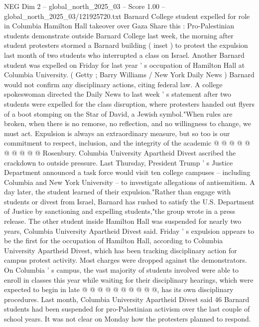 \begin{textsample}{NEG Dim 2 – global\_north\_2025\_03 – Score 1.00 – global\_north\_2025\_03/121925720.txt}  \label{ex:f2_neg_048}
Barnard College student expelled for role in Columbia Hamilton Hall takeover over Gaza Share this : Pro-Palestinian students demonstrate outside Barnard College last week, the morning after student protesters stormed a Barnard building ( inset ) to protest the expulsion last month of two students who interrupted a class on Israel.
Another Barnard student was expelled on Friday for last year ' s occupation of Hamilton Hall at Columbia University. ( Getty ; Barry Williams / New York Daily News ) Barnard would not confirm any disciplinary actions, citing federal law.
A college spokeswoman directed the Daily News to last week ' s statement after two students were expelled for the class disruption, where protesters handed out flyers of a boot stomping on the Star of David, a Jewish symbol."When rules are broken, when there is no remorse, no reflection, and no willingness to change, we must act.
Expulsion is always an extraordinary measure, but so too is our commitment to respect, inclusion, and the integrity of the academic @ @ @ @ @ @ @ @ @ @ Rosenbury.
Columbia University Apartheid Divest ascribed the crackdown to outside pressure.
Last Thursday, President Trump ' s Justice Department announced a task force would visit ten college campuses -- including Columbia and New York University -- to investigate allegations of antisemitism.
A day later, the student learned of their expulsion."Rather than engage with students or divest from Israel, Barnard has rushed to satisfy the U.S.
Department of Justice by sanctioning and expelling students,"the group wrote in a press release.
The other student inside Hamilton Hall was suspended for nearly two years, Columbia University Apartheid Divest said.
Friday ' s expulsion appears to be the first for the occupation of Hamilton Hall, according to Columbia University Apartheid Divest, which has been tracking disciplinary action for campus protest activity.
Most charges were dropped against the demonstrators.
On Columbia ' s campus, the vast majority of students involved were able to enroll in classes this year while waiting for their disciplinary hearings, which were expected to begin in late @ @ @ @ @ @ @ @ @ @, has its own disciplinary procedures.
Last month, Columbia University Apartheid Divest said 46 Barnard students had been suspended for pro-Palestinian activism over the last couple of school years.
It was not clear on Monday how the protesters planned to respond.

\end{textsample}
